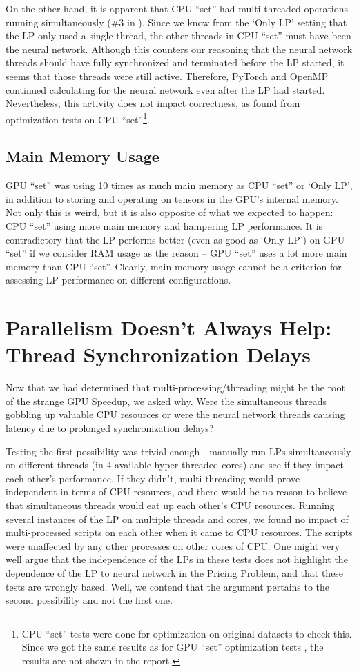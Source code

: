 On the other hand, it is apparent that CPU ``set'' had multi-threaded operations running simultaneously (\#3 in ). Since we know from the `Only LP' setting that the LP only used a single thread, the other threads in CPU ``set'' must have been the neural network. Although this counters our reasoning that the neural network threads should have fully synchronized and terminated before the LP started, it seems that those threads were still active. Therefore, PyTorch and OpenMP continued calculating for the neural network even after the LP had started. Nevertheless, this activity does not impact correctness, as found from optimization tests on CPU ``set''\footnote{CPU ``set'' tests were done for optimization on original datasets to check this. Since we got the same results as for GPU ``set'' optimization tests , the results are not shown in the report.}.

\subsection{Main Memory Usage}
GPU ``set'' was using 10 times as much main memory as CPU ``set'' or `Only LP', in addition to storing and operating on tensors in the GPU's internal memory. Not only this is weird, but it is also opposite of what we expected to happen: CPU ``set'' using more main memory and hampering LP performance. It is contradictory that the LP performs better (even as good as `Only LP') on GPU ``set'' if we consider RAM usage as the reason -- GPU ``set'' uses a lot more main memory than CPU ``set''. Clearly, main memory usage cannot be a criterion for assessing LP performance on different configurations.

\section{Parallelism Doesn't Always Help: Thread Synchronization Delays} \label{app:Parallelism Doesn't Always Help}
Now that we had determined that multi-processing/threading might be the root of the strange GPU Speedup, we asked why. Were the simultaneous threads gobbling up valuable CPU resources or were the neural network threads causing latency due to prolonged synchronization delays?

Testing the first possibility was trivial enough - manually run LPs simultaneously on different threads (in 4 available hyper-threaded cores) and see if they impact each other's performance. If they didn't, multi-threading would prove independent in terms of CPU resources, and there would be no reason to believe that simultaneous threads would eat up each other's CPU resources. Running several instances of the LP on multiple threads and cores, we found no impact of multi-processed scripts on each other when it came to CPU resources. The scripts were unaffected by any other processes on other cores of CPU. One might very well argue that the independence of the LPs in these tests does not highlight the dependence of the LP to neural network in the Pricing Problem, and that these tests are wrongly based. Well, we contend that the argument pertains to the second possibility and not the first one. 

